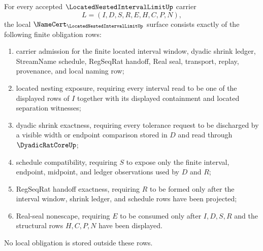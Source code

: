 \begin{theorem}
\label{thm:located-nested-interval-limit-namecert-obligations}
For every accepted $\LocatedNestedIntervalLimitUp$ carrier
$$
L=(I,D,S,R,E,H,C,P,N),
$$
the local $\NameCert_{\LocatedNestedIntervalLimitUp}$ surface consists exactly of the following finite obligation rows:
\begin{enumerate}
\item carrier admission for the finite located interval window, dyadic shrink ledger, StreamName schedule, RegSeqRat handoff, Real seal, transport, replay, provenance, and local naming row;
\item located nesting exposure, requiring every interval read to be one of the displayed rows of $I$ together with its displayed containment and located separation witnesses;
\item dyadic shrink exactness, requiring every tolerance request to be discharged by a visible width or endpoint comparison stored in $D$ and read through $\DyadicRatCoreUp$;
\item schedule compatibility, requiring $S$ to expose only the finite interval, endpoint, midpoint, and ledger observations used by $D$ and $R$;
\item RegSeqRat handoff exactness, requiring $R$ to be formed only after the interval window, shrink ledger, and schedule rows have been projected;
\item Real-seal nonescape, requiring $E$ to be consumed only after $I,D,S,R$ and the structural rows $H,C,P,N$ have been displayed.
\end{enumerate}
No local obligation is stored outside these rows.
\end{theorem}
